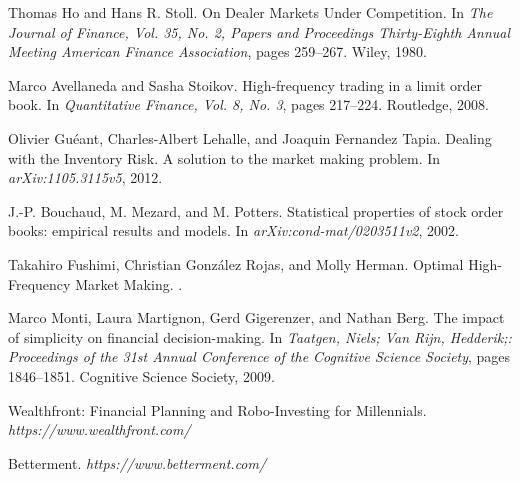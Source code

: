 \documentclass{article}
\begin{document}
\begin{thebibliography}{1}

Thomas Ho and Hans R. Stoll.
\newblock On Dealer Markets Under Competition.
\newblock In {\em The Journal of Finance, Vol. 35, No. 2, Papers and Proceedings Thirty-Eighth Annual Meeting American Finance Association}, pages 259--267. Wiley, 1980.

Marco Avellaneda and Sasha Stoikov.
\newblock High-frequency trading in a limit order book.
\newblock In {\em Quantitative Finance, Vol. 8, No. 3}, pages 217--224. Routledge, 2008.

Olivier Guéant, Charles-Albert Lehalle, and Joaquin Fernandez Tapia.
\newblock Dealing with the Inventory Risk. A solution to the market making problem.
\newblock In {\em 	arXiv:1105.3115v5}, 2012.

J.-P. Bouchaud, M. Mezard, and M. Potters.
\newblock Statistical properties of stock order books: empirical results and models.
\newblock In {\em arXiv:cond-mat/0203511v2}, 2002.

Takahiro Fushimi, Christian González Rojas, and Molly Herman.
\newblock Optimal High-Frequency Market Making.
.

Marco Monti, Laura Martignon, Gerd Gigerenzer, and Nathan Berg.
\newblock The impact of simplicity on financial decision-making.
\newblock In {\em Taatgen, Niels; Van Rijn, Hedderik;: Proceedings of the 31st Annual Conference of the Cognitive Science Society}, pages 1846--1851. Cognitive Science Society, 2009.

Wealthfront: Financial Planning and Robo-Investing for Millennials.
\newblock \emph{https://www.wealthfront.com/}

Betterment.
\newblock \emph{https://www.betterment.com/}

\end{thebibliography}
\end{document}
